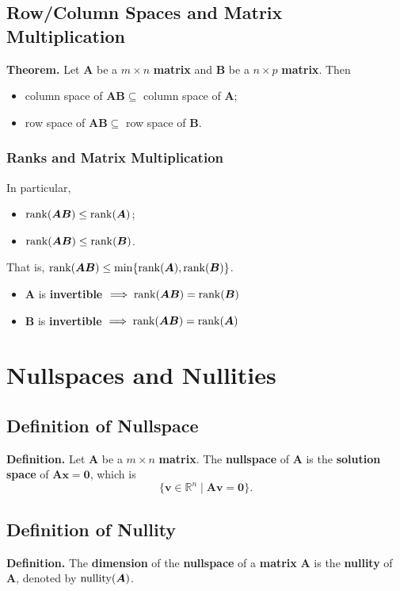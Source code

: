\documentclass[../ma2001_notes.tex]{subfiles}
\begin{document}
\subsection{Row/Column Spaces and Matrix Multiplication}
\textbf{Theorem.} Let \(\bm{A}\) be a \(m\times n\) \textbf{matrix} and \(\bm{B}\) be a \(n\times p\) \textbf{matrix}. Then
\begin{itemize}
	\item column space of \(\bm{AB}\subseteq\) column space of \(\bm{A}\);
	\item row space of \(\bm{AB}\subseteq\) row space of \(\bm{B}\).
\end{itemize}

\subsubsection{Ranks and Matrix Multiplication}
In particular,
\begin{itemize}
	\item\(\operatorname{rank}(\bm{AB})\leq\operatorname{rank}(\bm{A})\);
	\item\(\operatorname{rank}(\bm{AB})\leq\operatorname{rank}(\bm{B})\).
\end{itemize}
That is, \(\operatorname{rank}(\bm{AB})\leq\min\{\operatorname{rank}(\bm{A}),\operatorname{rank}(\bm{B})\}\).
\begin{itemize}
	\item\(\bm{A}\) is \textbf{invertible} \(\implies\operatorname{rank}(\bm{AB})=\operatorname{rank}(\bm{B})\)
	\item\(\bm{B}\) is \textbf{invertible} \(\implies\operatorname{rank}(\bm{AB})=\operatorname{rank}(\bm{A})\)
\end{itemize}

\section{Nullspaces and Nullities}
\subsection{Definition of Nullspace}
\textbf{Definition.} Let \(\bm{A}\) be a \(m\times n\) \textbf{matrix}. The \textbf{nullspace} of \(\bm{A}\) is the \textbf{solution space} of \(\bm{Ax}=\bm{0}\), which is
\[\{\bm{v}\in\mathbb{R}^n\mid\bm{Av}=\bm{0}\}.\]

\subsection{Definition of Nullity}
\textbf{Definition.} The \textbf{dimension} of the \textbf{nullspace} of a \textbf{matrix} \(\bm{A}\) is the \textbf{nullity} of \(\bm{A}\), denoted by \(\operatorname{nullity}(\bm{A})\).
\end{document}
